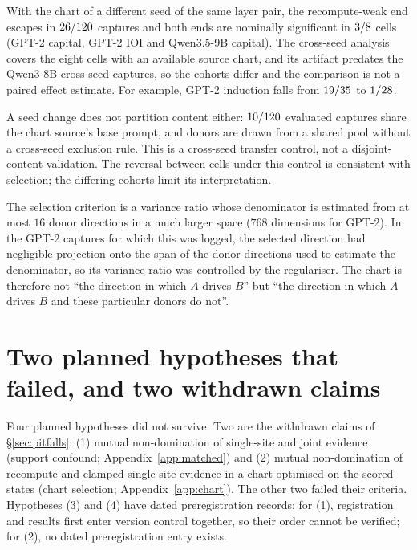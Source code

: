 With the chart of a different seed of the same layer pair, the
recompute-weak end escapes in $26/120$ captures and both ends are nominally significant in $3/8$
cells (GPT-2 capital, GPT-2 IOI and Qwen3.5-9B capital). The cross-seed analysis covers the eight cells with an
available source chart, and its artifact predates the Qwen3-8B cross-seed captures, so the cohorts differ and the
comparison is not a paired effect estimate. For example, GPT-2 induction falls from $19/35$ to
$1/28$.

A seed change does not partition content either:
$10/120$ evaluated captures share the chart source's base prompt, and donors are drawn from a shared
pool without a cross-seed exclusion rule. This is a cross-seed transfer control, not a disjoint-content
validation. The reversal between cells under this control is consistent with selection; the differing cohorts limit its interpretation.

The selection criterion is a variance ratio whose denominator is estimated from at most $16$ donor directions in a
much larger space ($768$ dimensions for GPT-2). In the GPT-2 captures for which this was logged, the selected direction had
negligible projection onto the span of the donor directions used to estimate the denominator, so its variance ratio was controlled by the
regulariser. The chart is therefore not ``the direction in which $A$ drives $B$'' but ``the direction in which $A$
drives $B$ and these particular donors do not''.

\section{Two planned hypotheses that failed, and two withdrawn claims}
\label{app:negatives}

Four planned hypotheses did not survive. Two are the withdrawn claims of \S\ref{sec:pitfalls}: (1) mutual
non-domination of single-site and joint evidence (support confound; Appendix~\ref{app:matched}) and (2) mutual
non-domination of recompute and clamped single-site evidence in a chart optimised on the scored states (chart
selection; Appendix~\ref{app:chart}). The other two failed their
criteria. Hypotheses (3) and (4) have dated preregistration records; for (1), registration and results first
enter version control together, so their order cannot be verified; for (2), no dated preregistration entry exists.

